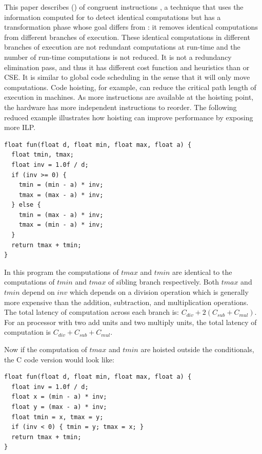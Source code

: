 \documentclass[sigplan,10pt,review,anonymous]{acmart}\settopmatter{printfolios=true,printccs=false,printacmref=false}
\begin{document}
This paper describes \gcm{} (\GCM{}) of congruent instructions
\cite{briggs1997}, a technique that uses the information computed for \PRE{} to
detect identical computations but has a transformation phase whose goal differs
from \PRE{}: it removes identical computations from different branches of
execution.  These identical computations in different branches of execution are
not redundant computations at run-time and the number of run-time computations
is not reduced. It is not a redundancy elimination pass, and thus it has
different cost function and heuristics than \PRE{} or CSE. It is similar to
global code scheduling \cite{dragonbook,click1995global} in the sense that it
will only move computations. Code hoisting, for example, can reduce the critical
path length of execution in \ooo{} machines. As more instructions are available
at the hoisting point, the hardware has more independent instructions to
reorder. The following reduced example illustrates how hoisting can improve
performance by exposing more ILP.

\begin{verbatim}
float fun(float d, float min, float max, float a) {
  float tmin, tmax;
  float inv = 1.0f / d;
  if (inv >= 0) {
    tmin = (min - a) * inv;
    tmax = (max - a) * inv;
  } else {
    tmin = (max - a) * inv;
    tmax = (min - a) * inv;
  }
  return tmax + tmin;
}
\end{verbatim}

In this program the computations of $tmax$ and $tmin$ are identical to the
computations of $tmin$ and $tmax$ of sibling branch respectively. Both $tmax$ and $tmin$
depend on $inv$ which depends on a division operation which is generally more
expensive than the addition, subtraction, and multiplication operations. The
total latency of computation across each branch is: $C_{div} + 2(C_{sub} + C_{mul})$.
For an \ooo{} processor with two add units and two multiply
units, the total latency of computation is $C_{div} + C_{sub} + C_{mul}$.

Now if the computation of $tmax$ and $tmin$ are hoisted outside the
conditionals, the C code version would look like:
\begin{verbatim}
float fun(float d, float min, float max, float a) {
  float inv = 1.0f / d;
  float x = (min - a) * inv;
  float y = (max - a) * inv;
  float tmin = x, tmax = y;
  if (inv < 0) { tmin = y; tmax = x; }
  return tmax + tmin;
}
\end{verbatim}
\end{document}
